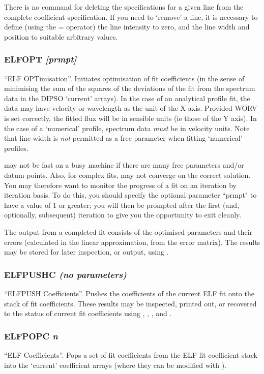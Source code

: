 \documentclass[twoside,11pt,noabs,nolof]{starlink}
\providecommand{\dipcom}[3]{\subsubsection*{\label{COM:#1}\xlabel{COM:#1}\textbf{#1} \emph{#2}}}
\begin{document}
There is no command for deleting the specifications for a given line
from the complete coefficient specification. If you need to `remove' a
line, it is necessary to define (using the = operator) the line
intensity to zero, and the line width and position to suitable
arbitrary values.

\dipcom{ELFOPT}{[prmpt]}{Fits a set of emission lines}
``ELF OPTimisation''. Initiates optimisation of fit coefficients (in
the sense of minimising the sum of the squares of the deviations of
the fit from the spectrum data in the DIPSO `current' arrays). In the
case of an analytical profile fit, the data may have velocity or
wavelength as the unit of the X axis. Provided WORV is set correctly,
the fitted flux will be in sensible units (ie those of the Y axis). In
the case of a `numerical' profile, spectrum data \emph{must} be in
velocity units. Note that line width is \emph{not} permitted as a free
parameter when fitting `numerical' profiles.

  may not be fast on a busy machine if there are many free
parameters and/or datum points. Also, for complex fits,   may not
converge on the correct solution. You may therefore want to monitor
the progress of a fit on an iteration by iteration basis. To do this,
you should specify the optional parameter ``prmpt" to have a value of
1 or greater; you will then be prompted after the first (and,
optionally, subsequent) iteration to give you the opportunity to exit
  cleanly.

The output from a completed fit consists of the optimised parameters
and their errors (calculated in the linear approximation, from the
error matrix). The results may be stored for later inspection, or
output, using .

\dipcom{ELFPUSHC}{(no parameters)}{Pushes the current ELF co-efficients onto the co-efficient stack}
``ELFPUSH Coefficients''. Pushes the coefficients of the current ELF
fit onto the stack of fit coefficients. These results may be
inspected, printed out, or recovered to the status of current fit
coefficients using ,  ,  ,  and .

\dipcom{ELFPOPC}{n}{Pops an entry from the ELF fit co-efficient stack}
``ELF   Coefficients''. Pops a set of fit coefficients from the ELF
fit coefficient stack into the `current' coefficient arrays (where
they can be modified with ).
\end{document}
